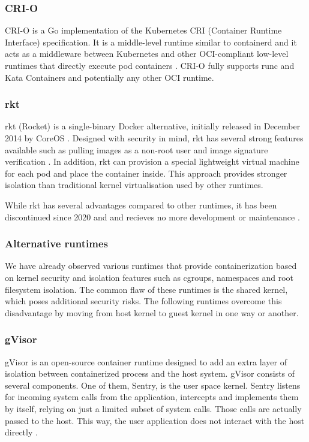 \subsubsection*{CRI-O}

CRI-O is a Go implementation of the Kubernetes CRI (Container Runtime Interface) specification. It is a middle-level runtime similar to containerd and it acts as a middleware between Kubernetes and other OCI-compliant low-level runtimes that directly execute pod containers \cite{c:4}. CRI-O fully supports runc and Kata Containers and potentially any other OCI runtime.

\subsubsection*{rkt}

rkt (Rocket) is a single-binary Docker alternative, initially released in December 2014 by CoreOS \cite{c:9}. Designed with security in mind, rkt has several strong features available such as pulling images as a non-root user and image signature verification \cite{c:10}. In addition, rkt can provision a special lightweight virtual machine for each pod and place the container inside. This approach provides stronger isolation than traditional kernel virtualisation used by other runtimes.

While rkt has several advantages compared to other runtimes, it has been discontinued since 2020 and and recieves no more development or maintenance \cite{gh:rkt}.

\subsubsection{Alternative runtimes}

We have already observed various runtimes that provide containerization based on kernel security and isolation features such as cgroups, namespaces and root filesystem isolation. The common flaw of these runtimes is the shared kernel, which poses additional security risks. The following runtimes overcome this disadvantage by moving from host kernel to guest kernel in one way or another.

\subsubsection*{gVisor}

gVisor is an open-source container runtime designed to add an extra layer of isolation between containerized process and the host system. gVisor consists of several components. One of them, Sentry, is the user space kernel. Sentry listens for incoming system calls from the application, intercepts and implements them by itself, relying on just a limited subset of system calls. Those calls are actually passed to the host. This way, the user application does not interact with the host directly \cite{acm:3}.

